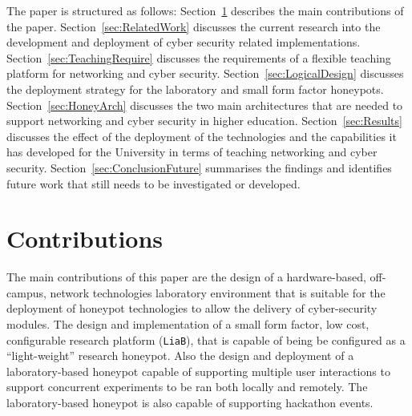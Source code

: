 \documentclass[10pt,journal]{IEEEtran}
\begin{document}
The paper is structured as follows: Section~\ref{sec:Contributions} describes the main contributions of the paper. Section~\ref{sec:RelatedWork} discusses the current research into the development and deployment of cyber security related implementations. Section~\ref{sec:TeachingRequire} discusses the requirements of a flexible teaching platform for networking and cyber security. Section~\ref{sec:LogicalDesign} discusses the deployment strategy for the laboratory and small form factor honeypots. Section~\ref{sec:HoneyArch} discusses the two main architectures that are needed to support networking and cyber security in higher education. Section~\ref{sec:Results} discusses the effect of the deployment of the technologies and the capabilities it has developed for the University in terms of teaching networking and cyber security. Section~\ref{sec:ConclusionFuture} summarises the findings and identifies future work that still needs to be investigated or developed.

\section{Contributions}\label{sec:Contributions}
The main contributions of this paper are the design of a hardware-based, off-campus, network technologies laboratory environment that is suitable for the deployment of honeypot technologies to allow the delivery of cyber-security modules. The design and implementation of a small form factor, low cost, configurable research platform (\texttt{LiaB}), that is capable of being be configured as a ``light-weight'' research honeypot. Also the design and deployment of a laboratory-based honeypot capable of supporting multiple user interactions to support concurrent experiments to be ran both locally and remotely. The laboratory-based honeypot is also capable of supporting hackathon events.  
\end{document}
